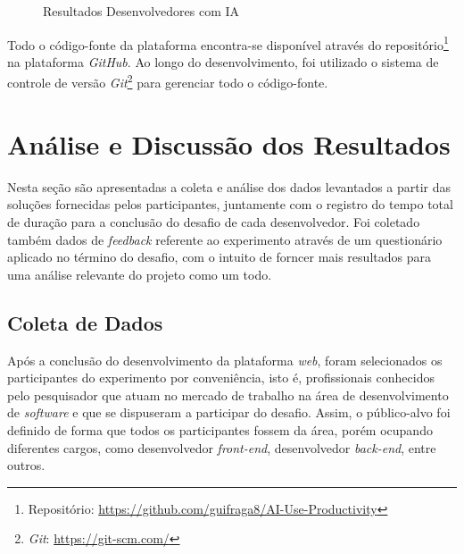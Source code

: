 \documentclass[english,brazilian]{UNISINOSartigo} %
\begin{document}
\begin{figure}[ht]
    \caption{Resultados Desenvolvedores com IA}
    \label{fig:resultados_com_ia_admin}
    \centering
    \footnotesize
    \begin{minipage}{.9\textwidth}
        \centering
    \end{minipage}
\end{figure}
\FloatBarrier

Todo o código-fonte da plataforma encontra-se disponível através do repositório\footnote{Repositório: \url{https://github.com/guifraga8/AI-Use-Productivity}} na plataforma \textit{GitHub}. Ao longo do desenvolvimento, foi utilizado o sistema de controle de versão \textit{Git}\footnote{\textit{Git}: \url{https://git-scm.com/}} para gerenciar todo o código-fonte.

\section{Análise e Discussão dos Resultados}

Nesta seção são apresentadas a coleta e análise dos dados levantados a partir das soluções fornecidas pelos participantes, juntamente com o registro do tempo total de duração para a conclusão do desafio de cada desenvolvedor. Foi coletado também dados de \textit{feedback} referente ao experimento através de um questionário aplicado no término do desafio, com o intuito de forncer mais resultados para uma análise relevante do projeto como um todo.

\subsection{Coleta de Dados}

Após a conclusão do desenvolvimento da plataforma \textit{web}, foram selecionados os participantes do experimento por conveniência, isto é, profissionais conhecidos pelo pesquisador que atuam no mercado de trabalho na área de desenvolvimento de \textit{software} e que se dispuseram a participar do desafio. Assim, o público-alvo foi definido de forma que todos os participantes fossem da área, porém ocupando diferentes cargos, como desenvolvedor \textit{front-end}, desenvolvedor \textit{back-end}, entre outros.
\end{document}
